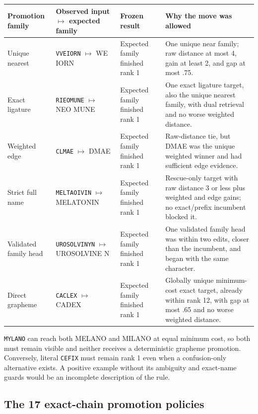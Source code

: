 \documentclass[10pt,a4paper]{article}
\newcommand{\observed}[1]{\texttt{#1}}
\begin{document}
\begin{tabularx}{\textwidth}{@{}L{34mm}L{45mm}L{29mm}Y@{}}
\toprule
Promotion family & Observed input $\mapsto$ expected family & Frozen result & Why the move was allowed \\
\midrule
Unique nearest & \observed{VVEIORN} $\mapsto$ WE IORN & Expected family finished rank 1 & One unique near family; raw distance at most 4, gain at least 2, and gap at most .75. \\
Exact ligature & \observed{RIEOMUNE} $\mapsto$ NEO MUNE & Expected family finished rank 1 & One exact ligature target, also the unique nearest family, with dual retrieval and no worse weighted distance. \\
Weighted edge & \observed{CLMAE} $\mapsto$ DMAE & Expected family finished rank 1 & Raw-distance tie, but DMAE was the unique weighted winner and had sufficient edge evidence. \\
Strict full name & \observed{MELTAOIVIN} $\mapsto$ MELATONIN & Expected family finished rank 1 & Rescue-only target with raw distance 3 or less plus weighted and edge gains; no exact/prefix incumbent blocked it. \\
Validated family head & \observed{UROSOLVINYN} $\mapsto$ UROSOLVINE N & Expected family finished rank 1 & One validated family head was within two edits, closer than the incumbent, and began with the same character. \\
Direct grapheme & \observed{CACLEX} $\mapsto$ CADEX & Expected family finished rank 1 & Globally unique minimum-cost exact target, already within rank 12, with gap at most .65 and no worse weighted distance. \\
\bottomrule
\end{tabularx}

\begin{safetybox}[title=The blocker is part of the rule]
\observed{MYLANO} can reach both MELANO and MILANO at equal minimum cost, so
both must remain visible and neither receives a deterministic grapheme
promotion. Conversely, literal \observed{CEFIX} must remain rank 1 even when a
confusion-only alternative exists. A positive example without its ambiguity
and exact-name guards would be an incomplete description of the rule.
\end{safetybox}

\subsection{The 17 exact-chain promotion policies}
\end{document}
